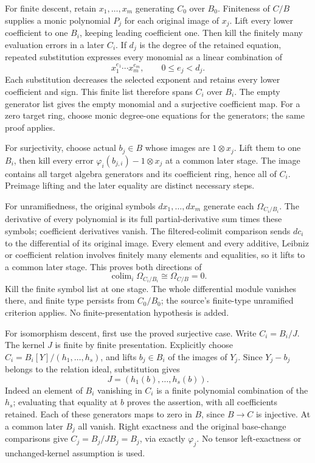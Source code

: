 For finite descent, retain \(x_1,\ldots,x_m\) generating \(C_0\) over \(B_0\). Finiteness of \(C/B\) supplies a monic polynomial \(P_j\) for each original image of \(x_j\). Lift every lower coefficient to one \(B_i\), keeping leading coefficient one. Then kill the finitely many evaluation errors in a later \(C_i\). If \(d_j\) is the degree of the retained equation, repeated substitution expresses every monomial as a linear combination of \[
x_1^{e_1}\cdots x_m^{e_m},\qquad 0\le e_j<d_j.
\] Each substitution decreases the selected exponent and retains every lower coefficient and sign. This finite list therefore spans \(C_i\) over \(B_i\). The empty generator list gives the empty monomial and a surjective coefficient map. For a zero target ring, choose monic degree-one equations for the generators; the same proof applies.

For surjectivity, choose actual \(b_j\in B\) whose images are \(1\otimes x_j\). Lift them to one \(B_i\), then kill every error \(\varphi_i(b_{j,i})-1\otimes x_j\) at a common later stage. The image contains all target algebra generators and its coefficient ring, hence all of \(C_i\). Preimage lifting and the later equality are distinct necessary steps.

For unramifiedness, the original symbols \(dx_1,\ldots,dx_m\) generate each \(\Omega_{C_i/B_i}\). The derivative of every polynomial is its full partial-derivative sum times these symbols; coefficient derivatives vanish. The filtered-colimit comparison sends \(dc_i\) to the differential of its original image. Every element and every additive, Leibniz or coefficient relation involves finitely many elements and equalities, so it lifts to a common later stage. This proves both directions of \[
\operatorname{colim}_i\Omega_{C_i/B_i}\cong\Omega_{C/B}=0.
\] Kill the finite symbol list at one stage. The whole differential module vanishes there, and finite type persists from \(C_0/B_0\); the source's finite-type unramified criterion applies. No finite-presentation hypothesis is added.

For isomorphism descent, first use the proved surjective case. Write \(C_i=B_i/J\). The kernel \(J\) is finite by finite presentation. Explicitly choose \(C_i=B_i[Y]/(h_1,\ldots,h_s)\), and lifts \(b_j\in B_i\) of the images of \(Y_j\). Since \(Y_j-b_j\) belongs to the relation ideal, substitution gives \[
J=(h_1(b),\ldots,h_s(b)).
\] Indeed an element of \(B_i\) vanishing in \(C_i\) is a finite polynomial combination of the \(h_s\); evaluating that equality at \(b\) proves the assertion, with all coefficients retained. Each of these generators maps to zero in \(B\), since \(B\to C\) is injective. At a common later \(B_j\) all vanish. Right exactness and the original base-change comparisons give \(C_j=B_j/JB_j=B_j\), via exactly \(\varphi_j\). No tensor left-exactness or unchanged-kernel assumption is used.

